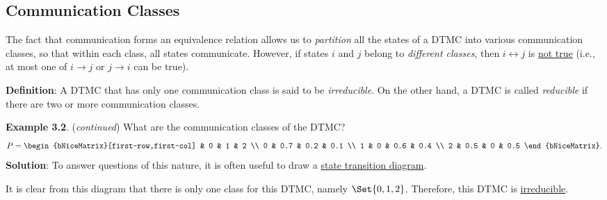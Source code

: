 \subsection*{Communication Classes}
The fact that communication forms an equivalence relation allows us to \emph{partition} all the states
of a DTMC into various communication classes, so that within each class, all states
communicate. However, if states $i$ and $j$ belong to \emph{different classes}, then $ i\leftrightarrow j $ is \underline{not true}
(i.e., at most one of $ i\to j $ or $ j\to i $ can be true).
\begin{Regular}
    \textbf{Definition}: A DTMC that has only one communication class is said to be \emph{irreducible}. On the
    other hand, a DTMC is called \emph{reducible} if there are two or more communication classes.
\end{Regular}
\begin{Example}
    \textbf{Example 3.2}. (\emph{continued}) What are the communication classes of the DTMC\@?
    \[ P=\begin{bNiceMatrix}[first-row,first-col]
              & 0   & 1   & 2   \\
            0 & 0.7 & 0.2 & 0.1 \\
            1 & 0   & 0.6 & 0.4 \\
            2 & 0.5 & 0   & 0.5
        \end{bNiceMatrix}. \]
    \tcblower{}
    \textbf{Solution}: To answer questions of this nature, it is often useful to
    draw a \underline{state transition diagram}.
    \begin{center}
    \end{center}
    It is clear from this diagram that there is only one class for this DTMC,
    namely $ \Set{0,1,2} $. Therefore, this DTMC is
    \underline{irreducible}.
\end{Example}
